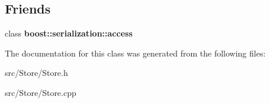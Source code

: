 \subsection*{Friends}
\begin{DoxyCompactItemize}
\item 
\hypertarget{classStore_ac98d07dd8f7b70e16ccb9a01abf56b9c}{class {\bfseries boost\-::serialization\-::access}}\label{classStore_ac98d07dd8f7b70e16ccb9a01abf56b9c}

\end{DoxyCompactItemize}


The documentation for this class was generated from the following files\-:\begin{DoxyCompactItemize}
\item 
src/\-Store/Store.\-h\item 
src/\-Store/Store.\-cpp\end{DoxyCompactItemize}
